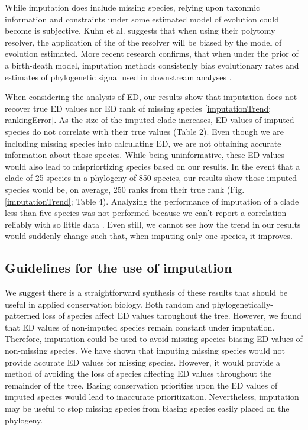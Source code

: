 \documentclass[12pt,english]{article}
\begin{document}
While imputation does include missing species, relying upon taxonmic information
and constraints under some estimated model of evolution could become is
subjective. Kuhn et al. \citeyear{2011} suggests that when using their polytomy
resolver, the application of the of the resolver will be biased by the model of
evolution estimated. More recent research confirms, that when under the prior of
a birth-death model, imputation methods consistenly bias evolutionary rates and
estimates of phylogenetic signal used in downstream analyses
\autocite{Rabosky2014}. 

When considering the analysis of ED, our results show that imputation does not
recover true ED values nor ED rank of missing species \ref{imputationTrend;
rankingError}. As the size of the imputed clade increases, ED values of imputed
species do not correlate with their true values (Table 2). Even though we are
including missing species into calculating ED, we are not obtaining accurate
information about those species. While being uninformative, these ED values
would also lead to mispriortizing species based on our results. In the event
that a clade of 25 species in a phylogeny of 850 species, our results show those
imputed species would be, on average, 250 ranks from their true rank (Fig.
\ref{imputationTrend}; Table 4). Analyzing the performance of imputation of a
clade less than five species was not performed because we can't report a
correlation reliably with so little data \autocite{Crawley2012}. Even still, we
cannot see how the trend in our results would suddenly change such that, when
imputing only one species, it improves.  


\subsection*{Guidelines for the use of imputation}
We suggest there is a straightforward synthesis of these results that should be
useful in applied conservation biology. Both random and
phylogenetically-patterned loss of species affect ED values throughout the tree.
However, we found that ED values of non-imputed species remain constant under
imputation. Therefore, imputation could be used to avoid missing species biasing
ED values of non-missing species. We have shown that imputing missing species
would not provide accurate ED values for missing species. However, it would
provide a method of avoiding the loss of species affecting ED values throughout
the remainder of the tree. Basing conservation priorities upon the ED values of
imputed species would lead to inaccurate prioritization. Nevertheless,
imputation may be useful to stop missing species from biasing species easily
placed on the phylogeny. 
\end{document}
